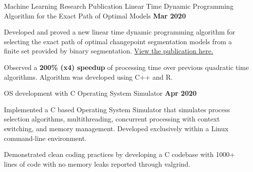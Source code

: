\newcommand{\ts}{\textsuperscript}



\begin{cventries}

  \cventry
    {Machine Learning Research Publication }%
    {Linear Time Dynamic Programming Algorithm for the Exact Path of Optimal Models}     
    {\textbf{Mar 2020}}%
    {} %
    {
      \begin{cvitems} %
        \item {Developed and proved a new linear time dynamic programming algorithm for selecting the exact path of optimal changepoint segmentation models from a finite set provided by binary segmentation. \href{https://arxiv.org/abs/2003.02808}{View the publication here.}}
        \item { Observed a \textbf{200\% (x4) speedup} of processing time over previous quadratic time algorithms. Algorithm was developed using C++ and R.}
      \end{cvitems}
    }
    
 \cventry
    {OS development with C} %
    {Operating System Simulator} %
    {\textbf{Apr 2020}}%
    {} %
    {
      \begin{cvitems} %
        \item {Implemented a C based Operating System Simulator that simulates process selection algorithms, multithreading, concurrent processing with context switching, and memory management. Developed exclusively within a Linux command-line environment.}
        \item {Demonstrated clean coding practices by developing a C codebase with 1000+ lines of code with no memory leaks reported through valgrind.}
      \end{cvitems}
    }
    

\end{cventries}
